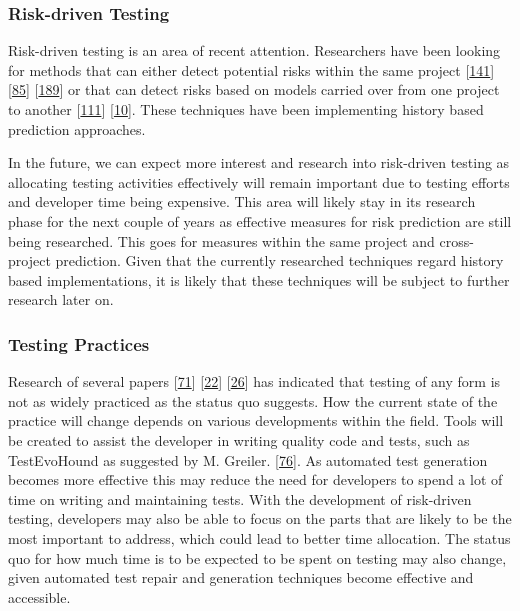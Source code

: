 \documentclass[]{book}
\begin{document}
\subsubsection{Risk-driven Testing}\label{risk-driven-testing-1}

Risk-driven testing is an area of recent attention. Researchers have
been looking for methods that can either detect potential risks within
the same project {[}\protect\hyperlink{ref-noor2015test}{141}{]}
{[}\protect\hyperlink{ref-hemmati2018}{85}{]}
{[}\protect\hyperlink{ref-vernotte2015}{189}{]} or that can detect risks
based on models carried over from one project to another
{[}\protect\hyperlink{ref-leung2015testing}{111}{]}
{[}\protect\hyperlink{ref-atifi2017}{10}{]}. These techniques have been
implementing history based prediction approaches.

In the future, we can expect more interest and research into risk-driven
testing as allocating testing activities effectively will remain
important due to testing efforts and developer time being expensive.
This area will likely stay in its research phase for the next couple of
years as effective measures for risk prediction are still being
researched. This goes for measures within the same project and
cross-project prediction. Given that the currently researched techniques
regard history based implementations, it is likely that these techniques
will be subject to further research later on.

\subsubsection{Testing Practices}\label{testing-practices}

Research of several papers
{[}\protect\hyperlink{ref-GAROUSI20131354}{71}{]}
{[}\protect\hyperlink{ref-beller2017developer}{22}{]}
{[}\protect\hyperlink{ref-beller2015}{26}{]} has indicated that testing
of any form is not as widely practiced as the status quo suggests. How
the current state of the practice will change depends on various
developments within the field. Tools will be created to assist the
developer in writing quality code and tests, such as TestEvoHound as
suggested by M. Greiler. {[}\protect\hyperlink{ref-greiler2013}{76}{]}.
As automated test generation becomes more effective this may reduce the
need for developers to spend a lot of time on writing and maintaining
tests. With the development of risk-driven testing, developers may also
be able to focus on the parts that are likely to be the most important
to address, which could lead to better time allocation. The status quo
for how much time is to be expected to be spent on testing may also
change, given automated test repair and generation techniques become
effective and accessible.
\end{document}
